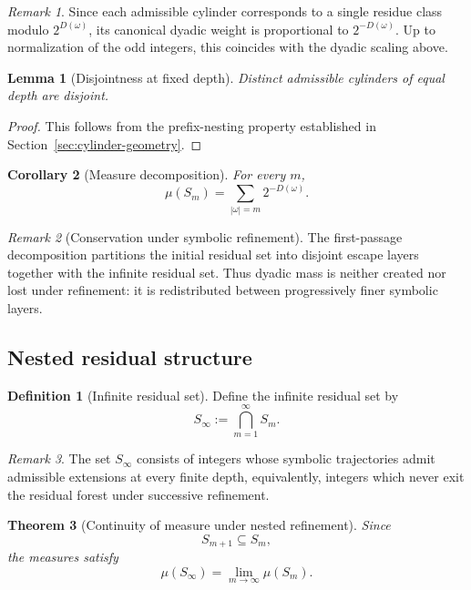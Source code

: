 \documentclass[12pt, oneside]{article}
\numberwithin{equation}{section}
\theoremstyle{definition}
\newtheorem{definition}{Definition}[section]
\theoremstyle{plain}
\newtheorem{theorem}{Theorem}[section]
\newtheorem{lemma}[theorem]{Lemma}
\newtheorem{corollary}[theorem]{Corollary}
\theoremstyle{remark}
\newtheorem*{remark}{Remark}
\begin{document}
\begin{remark}
Since each admissible cylinder corresponds to a single residue class
modulo \(2^{D(\omega)}\), its canonical dyadic weight is proportional
to \(2^{-D(\omega)}\). Up to normalization of the odd integers, this
coincides with the dyadic scaling above.
\end{remark}

\begin{lemma}[Disjointness at fixed depth]
Distinct admissible cylinders of equal depth are disjoint.
\end{lemma}

\begin{proof}
This follows from the prefix-nesting property established in
Section~\ref{sec:cylinder-geometry}.
\end{proof}

\begin{corollary}[Measure decomposition]
\label{cor:measure-decomposition}
For every \(m\),
\[
\mu(S_m) = \sum_{|\omega|=m}2^{-D(\omega)}.
\]
\end{corollary}

\begin{remark}[Conservation under symbolic refinement]
The first-passage decomposition partitions the initial residual set
into disjoint escape layers together with the infinite residual set.
Thus dyadic mass is neither created nor lost under refinement:
it is redistributed between progressively finer symbolic layers.
\end{remark}

\subsection{Nested residual structure}

\begin{definition}[Infinite residual set]
Define the infinite residual set by
\[
S_\infty := \bigcap_{m=1}^{\infty} S_m.
\]
\end{definition}

\begin{remark}
The set \(S_\infty\) consists of integers whose symbolic trajectories
admit admissible extensions at every finite depth, equivalently,
integers which never exit the residual forest under successive refinement.
\end{remark}

\begin{theorem}[Continuity of measure under nested refinement]
\label{thm:nested-measure}
Since
\[
S_{m+1}\subseteq S_m,
\]
the measures satisfy
\[
\mu(S_\infty) = \lim_{m\to\infty}\mu(S_m).
\]
\end{theorem}
\end{document}
